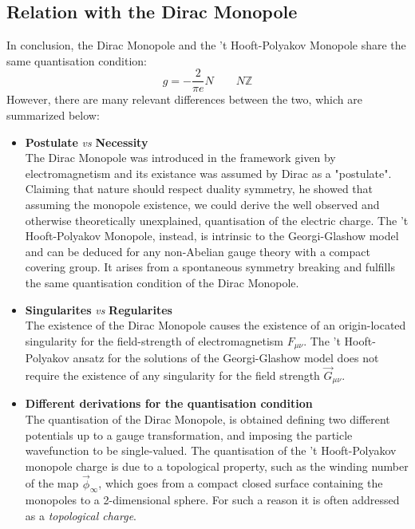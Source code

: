 \documentclass[main.tex]{subfiles}
\begin{document}
\subsection{Relation with the Dirac Monopole}
In conclusion, the Dirac Monopole and the 't Hooft-Polyakov Monopole share the same quantisation condition: 
\begin{equation}
g = - \frac{2}{\pi e} N \qquad N  \mathbb{Z}
\end{equation}
However, there are many relevant differences between the two, which are summarized below:
\begin{itemize}
     \item \textbf{Postulate} \textit{vs} \textbf{Necessity}\medskip \\
    The Dirac Monopole was introduced in the framework given by electromagnetism and its existance was assumed by Dirac as a "postulate". Claiming that nature should respect duality symmetry, he showed that assuming the monopole existence, we could derive the well observed and otherwise theoretically unexplained, quantisation of the electric charge. 
    The 't Hooft-Polyakov Monopole, instead, is intrinsic to the Georgi-Glashow model and can be deduced for any non-Abelian gauge theory with a compact covering group. It arises from a spontaneous symmetry breaking and fulfills the same quantisation condition of the Dirac Monopole.
    
    \item \textbf{Singularites} \textit{vs} \textbf{Regularites}\medskip \\
    The existence of the Dirac Monopole causes the existence of an origin-located singularity for the field-strength of electromagnetism $F_{\mu \nu}$.
    The 't Hooft-Polyakov ansatz for the solutions of the Georgi-Glashow model does not require the existence of any singularity for the field strength $\vec{G}_{\mu \nu }$.
    
    \item \textbf{Different derivations for the quantisation condition} \medskip \\
    The quantisation of the Dirac Monopole, is obtained defining two different potentials up to a gauge transformation, and imposing the particle wavefunction to be single-valued. 
    The quantisation of the 't Hooft-Polyakov monopole charge is due to a topological property, such as the winding number of the map $\vec{\phi}_\infty $, which goes from a compact closed surface containing the monopoles to a 2-dimensional sphere. For such a reason it is often addressed as a \textit{topological charge}.
\end{itemize} 
\end{document}
